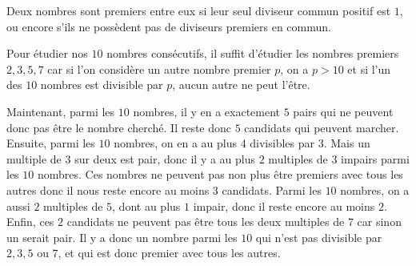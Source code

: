 Deux nombres sont premiers entre eux si leur seul diviseur commun positif est $1$, ou encore s'ils ne possèdent pas de diviseurs premiers en commun.

Pour étudier nos $10$ nombres consécutifs, il suffit d'étudier les nombres premiers $2,3,5,7$ car si l'on considère un autre nombre premier $p$, on a $p>10$ et si l'un des $10$ nombres est divisible par $p$, aucun autre ne peut l'être.

Maintenant, parmi les $10$ nombres, il y en a exactement $5$ pairs qui ne peuvent donc pas être le nombre cherché. Il reste donc $5$ candidats qui peuvent marcher. Ensuite, parmi les $10$ nombres, on en a au plus $4$ divisibles par $3$. Mais un multiple de $3$ sur deux est pair, donc il y a au plus $2$ multiples de $3$ impairs parmi les $10$ nombres. Ces nombres ne peuvent pas non plus être premiers avec tous les autres donc il nous reste encore au moins $3$ candidats. Parmi les $10$ nombres, on a aussi $2$ multiples de $5$, dont au plus $1$ impair, donc il reste encore au moins $2$. Enfin, ces $2$ candidats ne peuvent pas être tous les deux multiples de $7$ car sinon un serait pair. Il y a donc un nombre parmi les $10$ qui n'est pas divisible par $2,3,5$ ou $7$, et qui est donc premier avec tous les autres.